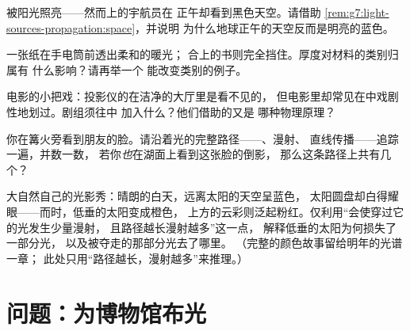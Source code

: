 \begin{exercise}[$\star$]\label{exo:g7:light-sources-propagation:8}
被阳光照亮——然而上的宇航员在
正午却看到黑色天空。请借助
\cref{rem:g7:light-sources-propagation:space}，并说明
为什么地球正午的天空反而是明亮的蓝色。
\end{exercise}

\begin{exercise}[$\star\star$]\label{exo:g7:light-sources-propagation:9}
一张纸在手电筒前透出柔和的暖光；
合上的书则完全挡住。厚度对材料的类别归属有
什么影响？请再举一个
能改变类别的例子。
\end{exercise}

\begin{exercise}[$\star\star$]\label{exo:g7:light-sources-propagation:10}
电影的小把戏：投影仪的在洁净的大厅里是看不见的，
但电影里却常见在中戏剧性地划过。剧组须往中
加入什么？他们借助的又是
哪种物理原理？
\end{exercise}

\begin{exercise}[$\star\star$]\label{exo:g7:light-sources-propagation:11}
你在篝火旁看到朋友的脸。请沿着光的完整路径——、漫射、
直线传播——追踪一遍，并数一数，
若你\emph{也}在湖面上看到这张脸的倒影，
那么这条路径上共有几个？
\end{exercise}

\begin{exercise}[$\star\star\star$]\label{exo:g7:light-sources-propagation:12}
大自然自己的光影秀：晴朗的白天，远离太阳的天空呈蓝色，
太阳圆盘却白得耀眼——而时，低垂的太阳变成橙色，
上方的云彩则泛起粉红。仅利用“会使穿过它的光发生少量漫射，
且路径越长漫射越多”这一点，
解释低垂的太阳为何损失了一部分光，
以及被夺走的那部分光去了哪里。
（完整的颜色故事留给明年的光谱一章；
此处只用“路径越长，漫射越多”来推理。）
\end{exercise}

\section{问题：为博物馆布光}

